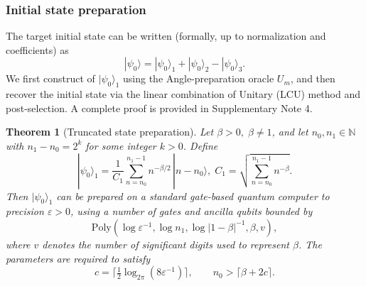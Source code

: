 \documentclass[aps,pra,twocolumn,superscriptaddress,preprintnumbers,amsmath,amssymb]{revtex4-2}
\newtheorem{Theorem}{Theorem}
\begin{document}
\subsubsection{Initial state preparation}
The target initial state can be written (formally, up to normalization and coefficients) as
\begin{equation}
    |\psi_0\rangle=|\psi_0\rangle_1+|\psi_0\rangle_2- |\psi_0\rangle_3.
\end{equation}
We first construct of $|\psi_0\rangle_1$ using the Angle-preparation oracle $U_m$, and then  recover the initial state via the linear combination of Unitary (LCU) method and post-selection. A complete proof is provided in Supplementary Note 4.
\begin{Theorem}[Truncated state preparation]\label{th:tru}
    Let $\beta>0,\;\beta \neq 1$, and let $n_0,n_1\in\mathbb{N}$ with $n_1-n_0=2^k$ for some integer $k>0$. Define
    \begin{equation}
        |\psi_0 \rangle_1 =\frac{1}{C_1}\textstyle\sum\limits_{n=n_0}^{n_1-1} n^{-\beta/2}\,|n-n_0\rangle,
    \;
        C_1=\sqrt{ \textstyle\sum\limits_{n=n_0}^{n_1-1} n^{-\beta}}.
    \end{equation}
    Then  $|\psi_0\rangle_1$ can be prepared on a standard gate-based quantum computer to precision $\varepsilon>0$, using a number of gates and ancilla qubits bounded by 
    \begin{equation}
        \mathrm{Poly}(\log \varepsilon^{-1}, \log n_1,  \log|1-\beta|^{-1},  \beta,  v ),
    \end{equation}
    where $v$ denotes the number of significant digits used to represent $\beta$. The parameters are required to satisfy
    \begin{equation}
        c =\lceil \tfrac{1}{2}\log_{2\pi}(8\varepsilon^{-1})\rceil, 
        \qquad n_0 > \lceil \beta + 2c \rceil.
    \end{equation}
\end{Theorem}
\end{document}

